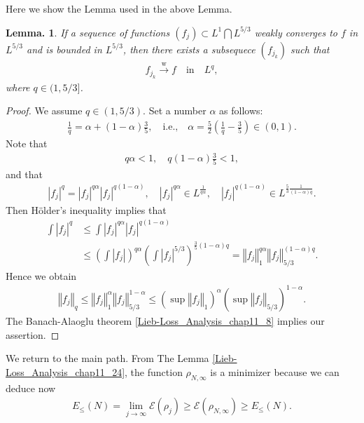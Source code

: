 \documentclass[openany, a4paper, oneside]{book}
\theoremstyle{break}
\newtheorem{lem}[thm]{Lemma.}
\theoremstyle{breakdefn}
\newcommand{\abs}[1]{\left|#1\right|}
\newcommand{\norm}[1]{\left\Vert#1\right\Vert}
\newcommand{\rbk}[1]{\left (#1\right)}
\newcommand{\calE}{\mathcal{E}}
\newcommand{\EleqN}{E_{\leq}(N)}
\newcommand{\limjtoinfty}{\lim_{j \to \infty}}
\newcommand{\rhoNinfty}{\rho_{N, \infty}}
\newcommand{\wto}{\xrightarrow{\text{w}}}
\begin{document}
Here we show the Lemma used in the above Lemma.
\begin{lem}\label{Lieb-Loss_Analysis_chap11_23}
 If a sequence of functions $(f_j) \subset L^{1} \bigcap L^{5/3}$ weakly converges to $f$ in $L^{5/3}$ and is bounded in $L^{5/3}$,
 then there exists a subsequece $(f_{j_k})$ such that
 \begin{align}
  f_{j_k} \wto f \quad \mathrm{in} \quad L^q,
 \end{align}
 where $q \in (1, 5/3]$.
\end{lem}
\begin{proof}
We assume $q \in (1, 5/3)$.
Set a number $\alpha$ as follows:
\begin{align}
 \frac{1}{q}
 =
 \alpha + (1 - \alpha) \frac{3}{5}, \quad \text{i.e.,} \quad
 \alpha
 =
 \frac{5}{2} \rbk{\frac{1}{q} - \frac{3}{5}} \in \rbk{0, 1}.
\end{align}
Note that
\begin{align}
 q \alpha < 1, \quad q (1 - \alpha) \frac{3}{5} < 1,
\end{align}
and that
\begin{align}
 \abs{f_j}^{q}
 =
 \abs{f_j}^{q \alpha} \abs{f_j}^{q (1 - \alpha)}, \quad
 \abs{f_j}^{q \alpha} \in L^{\frac{1}{q \alpha}}, \quad
 \abs{f_j}^{q (1 - \alpha)} \in L^{\frac{5}{3} \frac{1}{(1 - \alpha) q}}.
\end{align}
Then H\"older's inequality implies that
\begin{align}
 \int \abs{f_j}^q
 &\leq
 \int \abs{f_j}^{q \alpha} \abs{f_j}^{q (1 - \alpha)} \\
 &\leq
 \rbk{\int \abs{f_j}}^{q \alpha} \rbk{\int \abs{f_j}^{5/3}}^{\frac{3}{5} (1 - \alpha) q}
 =
 \norm{f_j}_{1}^{q \alpha} \norm{f_j}_{5/3}^{(1 - \alpha) q}.
\end{align}
Hence we obtain
\begin{align}
 \norm{f_j}_{q}
 \leq
 \norm{f_j}_{1}^{\alpha} \norm{f_j}_{5/3}^{1 - \alpha}
 \leq
 \rbk{\sup \norm{f_j}_{1}}^{\alpha} \rbk{\sup \norm{f_j}_{5/3}}^{1 - \alpha}.
\end{align}
The Banach-Alaoglu theorem \ref{Lieb-Loss_Analysis_chap11_8} implies our assertion.
\end{proof}

We return to the main path.
From The Lemma \ref{Lieb-Loss_Analysis_chap11_24}, the function $\rhoNinfty$ is a minimizer because we can deduce now
\begin{align}
 \EleqN
 =
 \limjtoinfty \calE (\rho_j)
 \geq
 \calE (\rhoNinfty)
 \geq
 \EleqN.
\end{align}
\end{document}

